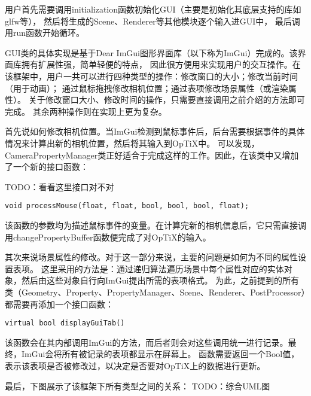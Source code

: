 用户首先需要调用initialization函数初始化GUI（主要是初始化其底层支持的库如glfw等），
然后将生成的Scene、Renderer等其他模块逐个输入进GUI中，
最后调用run函数开始循环。

GUI类的具体实现是基于Dear ImGui图形界面库\cite{Imgui}（以下称为ImGui）完成的。该界面库拥有扩展性强，简单轻便的特点，
因此很方便用来实现用户的交互操作。在该框架中，用户一共可以进行四种类型的操作：修改窗口的大小；修改当前时间（用于动画）；
通过鼠标拖拽修改相机位置；通过表项修改场景属性（或渲染属性）。
关于修改窗口大小、修改时间的操作，只需要直接调用之前介绍的方法即可完成。
其余两种操作则在实现上更为复杂。

首先说如何修改相机位置。当ImGui检测到鼠标事件后，后台需要根据事件的具体情况来计算出新的相机位置，然后将其输入到OpTiX中。
可以发现，CameraPropertyManager类正好适合于完成这样的工作。因此，在该类中又增加了一个新的接口函数：

TODO：看看这里接口对不对
\lstset{language=C++}
\begin{lstlisting}
void processMouse(float, float, bool, bool, bool, float);
\end{lstlisting}

该函数的参数均为描述鼠标事件的变量。在计算完新的相机信息后，它只需直接调用changePropertyBuffer函数便完成了对OpTiX的输入。

其次来说场景属性的修改。对于这一部分来说，主要的问题是如何为不同的属性设置表项。
这里采用的方法是：通过递归算法遍历场景中每个属性对应的实体对象，然后由这些对象自行向ImGui提出所需的表项格式。
为此，之前提到的所有类（Geometry、Property、PropertyManager、Scene、Renderer、PostProcessor）都需要再添加一个接口函数：
\lstset{language=C++}
\begin{lstlisting}
virtual bool displayGuiTab() 
\end{lstlisting}

该函数会在其内部调用ImGui的方法，而后者则会对这些调用统一进行记录。最终，ImGui会将所有被记录的表项都显示在屏幕上。
函数需要返回一个Bool值，表示该表项是否被修改过，以决定是否要对OpTiX上的数据进行更新。

最后，下图展示了该框架下所有类型之间的关系：
TODO：综合UML图